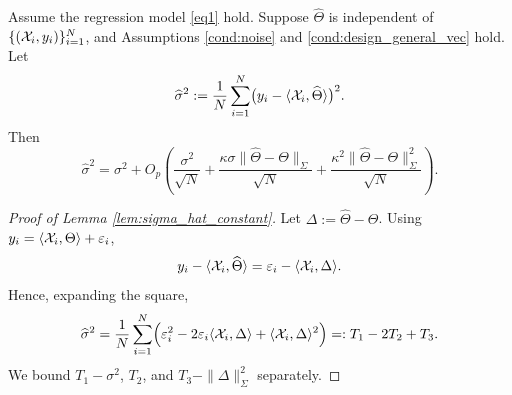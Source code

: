 \documentclass[authoryear,preprint,review,12pt]{elsarticle}
\begin{document}
{
	\begin{Lemma}\label{lem:sigma_hat_constant}
		Assume the regression model \ref{eq1} hold.
		Suppose $\widehat\Theta$ is independent of $\{(\mathcal{X}_i,y_i)\}_{i=1}^N$, and
		Assumptions \ref{cond:noise} and \ref{cond:design_general_vec} hold.
		Let
		\[
		\widehat\sigma^2:=\frac1N\sum_{i=1}^N\bigl(y_i-\langle \mathcal{X}_i,\widehat\Theta\rangle\bigr)^2 .
		\] 
		Then 
		\[
		\widehat\sigma^2
		=
		\sigma^2 +O_p\!\left( \frac{\sigma^2}{\sqrt{N}} +\frac{\kappa\sigma\|\widehat\Theta-\Theta\|_\Sigma}{\sqrt{N}}+\frac{\kappa^2\|\widehat\Theta-\Theta\|_\Sigma^2}{\sqrt{N}}\right).
		\]
	\end{Lemma}
	
	\begin{proof}[Proof of Lemma \ref{lem:sigma_hat_constant}]
		Let $\Delta:=\widehat\Theta-\Theta$. Using $y_i=\langle \mathcal{X}_i,\Theta\rangle+\varepsilon_i$,
		\[
		y_i-\langle \mathcal{X}_i,\widehat\Theta\rangle
		=
		\varepsilon_i-\langle \mathcal{X}_i,\Delta\rangle.
		\]
		Hence, expanding the square,
		\[
		\widehat\sigma^2
		=
		\frac1N\sum_{i=1}^N\Bigl(\varepsilon_i^2-2\varepsilon_i\langle \mathcal{X}_i,\Delta\rangle+\langle \mathcal{X}_i,\Delta\rangle^2\Bigr)
		=:T_1-2T_2+T_3.
		\]
		We bound $T_1-\sigma^2$, $T_2$, and $T_3-\|\Delta\|_\Sigma^2$ separately.
		

\end{proof}}
\end{document}
